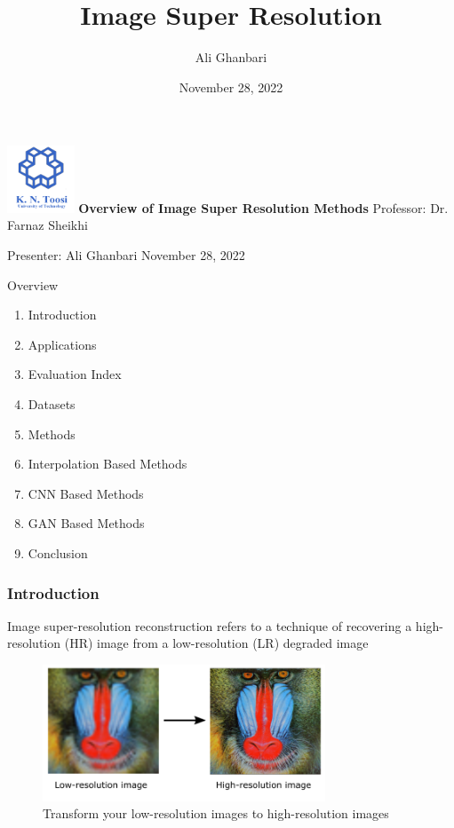 \documentclass[11pt, presentation]{beamer}
\title{Image Super Resolution}
\author{Ali Ghanbari}
\date{November 28, 2022}
\begin{document}
    \begin{frame}
        \centering
        \includegraphics[width=2cm]{images/kntu-logo-r1}
        \vfill
        \textbf{\Large Overview of Image Super Resolution Methods}
        \vfill
        Professor: Dr. Farnaz Sheikhi

        Presenter: Ali Ghanbari
        \vfill
        \small November 28, 2022
    \end{frame}
    \begin{frame}{Overview}
        \begin{enumerate}
            \item Introduction
            \item Applications
            \item Evaluation Index
            \item Datasets
	 \item Methods
            \item Interpolation Based Methods
            \item CNN Based Methods
            \item GAN Based Methods
            \item Conclusion
        \end{enumerate}
    \end{frame}
    \begin{frame}
        \frametitle{Introduction}
        Image super-resolution reconstruction refers to a technique of recovering
        a high-resolution (HR) image from a low-resolution (LR) degraded image~\cite{li2020}

        \begin{figure}
            \includegraphics[width=0.75\textwidth]{images/sisr}
            \caption{Transform your low-resolution images to high-resolution images~\cite{bhsri}}
            \label{fig:sisr}
        \end{figure}
    \end{frame}
\end{document}
